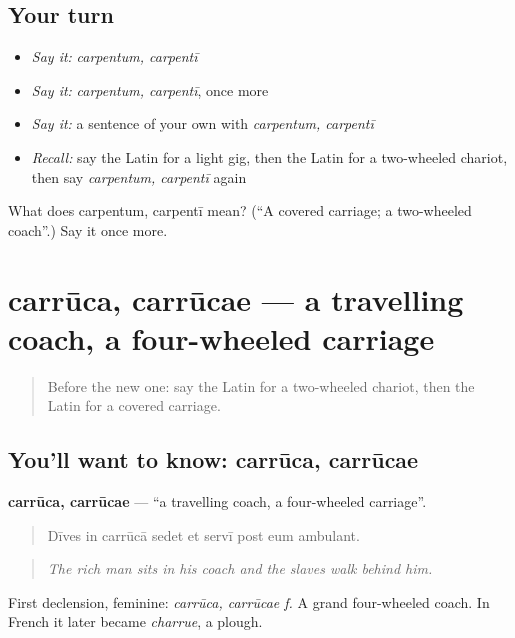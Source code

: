 \subsection*{Your turn}
\begin{itemize}
\raggedright
  \item \emph{Say it:} \emph{carpentum, carpentī}
  \item \emph{Say it:} \emph{carpentum, carpentī}, once more
  \item \emph{Say it:} a sentence of your own with \emph{carpentum, carpentī}
  \item \emph{Recall:} say the Latin for a light gig, then the Latin for a two-wheeled chariot, then say \emph{carpentum, carpentī} again
\end{itemize}

\begin{tcolorbox}[breakable,colback=teal!4,colframe=teal!35!black,title={Before you move on}]
What does carpentum, carpentī mean? (\textquotedblleft{}A covered carriage; a two-wheeled coach\textquotedblright{}.) Say it once more.
\end{tcolorbox}
\section[carrūca, carrūcae]{carrūca, carrūcae — a travelling coach, a four-wheeled carriage}

\label{lesson:LA-C429-carruca}



\begin{quote}
Before the new one: say the Latin for a two-wheeled chariot, then the Latin for a covered carriage.
\end{quote}

\subsection*{You'll want to know: carrūca, carrūcae}
\textbf{carrūca, carrūcae} — \textquotedblleft{}a travelling coach, a four-wheeled carriage\textquotedblright{}.

\begin{quote}
Dīves in carrūcā sedet et servī post eum ambulant.
\end{quote}

\begin{quote}
\emph{The rich man sits in his coach and the slaves walk behind him.}
\end{quote}

First declension, feminine: \emph{carrūca, carrūcae f.} A grand four-wheeled coach. In French it later became \emph{charrue}, a plough.

